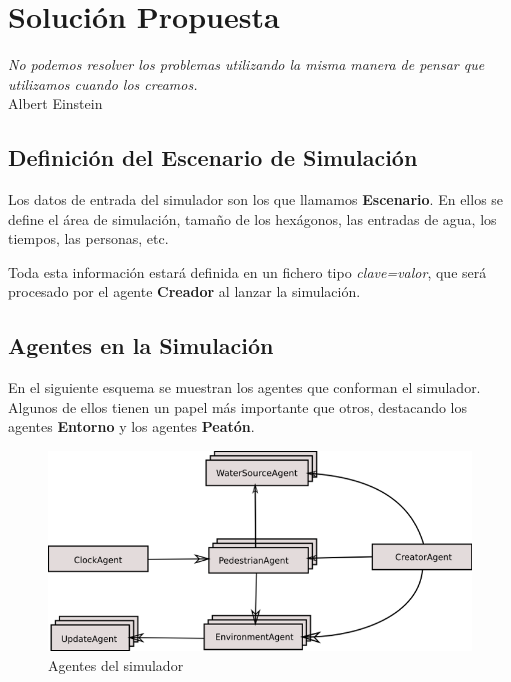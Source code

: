 \chapter{Solución Propuesta} \label{cap3}

\begin{flushright}
\begin{minipage}{7.85cm}
    {\em No podemos resolver los problemas utilizando la misma manera de pensar
    que utilizamos cuando los creamos.} \\ Albert Einstein
\end{minipage}
\end{flushright}

\vspace*{5mm}

\section{Definición del Escenario de Simulación}

Los datos de entrada del simulador son los que llamamos {\bf Escenario}. En
ellos se define el área de simulación, tamaño de los hexágonos, las entradas de
agua, los tiempos, las personas, etc.

Toda esta información estará definida en un fichero tipo {\em clave=valor}, que
será procesado por el agente {\bf Creador} al lanzar la simulación.

\section{Agentes en la Simulación}

En el siguiente esquema se muestran los agentes que conforman el simulador.
Algunos de ellos tienen un papel más importante que otros, destacando los
agentes {\bf Entorno} y los agentes {\bf Peatón}.

\begin{figure}[H]
 \centering
 \includegraphics[width=120mm]{figuras/cap3/agents.png}
 \caption{Agentes del simulador}
\end{figure}

